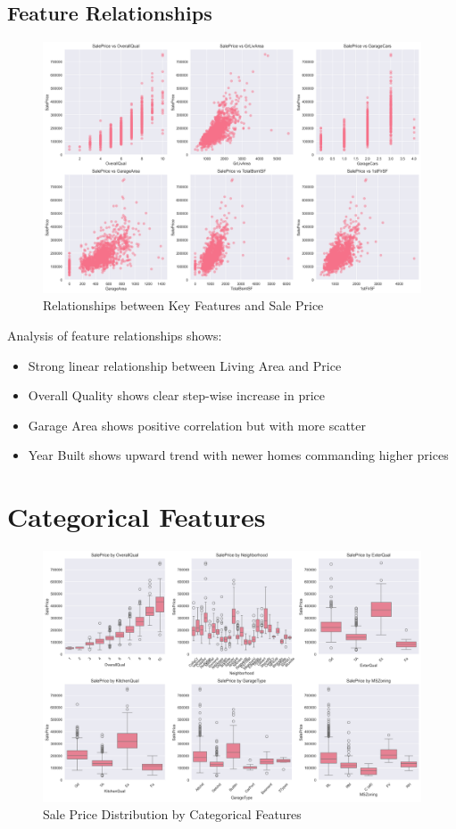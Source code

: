 \subsection{Feature Relationships}
\begin{figure}[H]
    \centering
    \includegraphics[width=1.0\textwidth]{figures/feature_vs_price.png}
    \caption{Relationships between Key Features and Sale Price}
    \label{fig:feature_price_relation}
\end{figure}

Analysis of feature relationships shows:
\begin{itemize}
    \item Strong linear relationship between Living Area and Price
    \item Overall Quality shows clear step-wise increase in price
    \item Garage Area shows positive correlation but with more scatter
    \item Year Built shows upward trend with newer homes commanding higher prices
\end{itemize}

\section{Categorical Features}
\begin{figure}[H]
    \centering
    \includegraphics[width=1.0\textwidth]{figures/categorical_features_dist.png}
    \caption{Sale Price Distribution by Categorical Features}
    \label{fig:cat_features_dist}
\end{figure}

